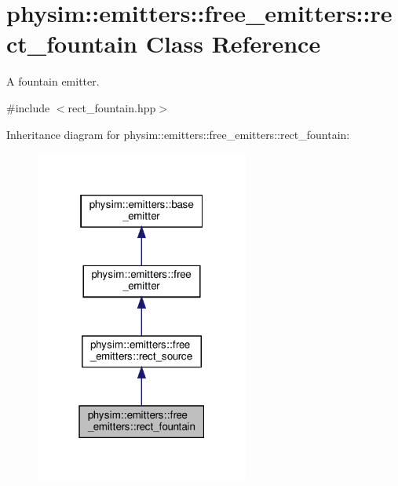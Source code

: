 \hypertarget{classphysim_1_1emitters_1_1free__emitters_1_1rect__fountain}{}\section{physim\+:\+:emitters\+:\+:free\+\_\+emitters\+:\+:rect\+\_\+fountain Class Reference}
\label{classphysim_1_1emitters_1_1free__emitters_1_1rect__fountain}


A fountain emitter.  




{\ttfamily \#include $<$rect\+\_\+fountain.\+hpp$>$}



Inheritance diagram for physim\+:\+:emitters\+:\+:free\+\_\+emitters\+:\+:rect\+\_\+fountain\+:\nopagebreak
\begin{figure}[H]
\begin{center}
\leavevmode
\includegraphics[width=199pt]{classphysim_1_1emitters_1_1free__emitters_1_1rect__fountain__inherit__graph}
\end{center}
\end{figure}


